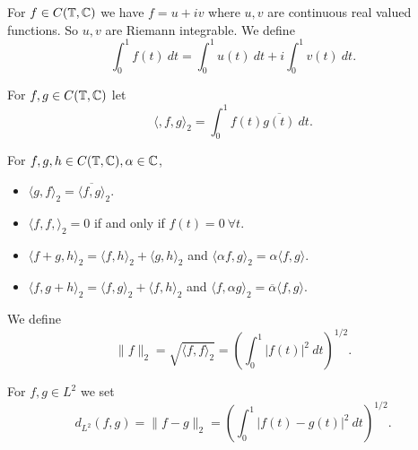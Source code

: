 \documentclass[twoside]{article}
\begin{document}
\begin{definition}
    For $f \in C(\mathbb{T}, \mathbb{C})$ we have $f = u + iv$ where $u, v$ are continuous 
    real valued functions. So $u, v$ are Riemann integrable. We define 
    \begin{equation*}
        \int_{0}^{1} f(t) \ dt = \int_{0}^{1} u(t) \ dt + i \int_{0}^{1}v(t) \ dt.
    \end{equation*}
\end{definition}

\begin{definition}
    For $f, g \in C(\mathbb{T}, \mathbb{C})$ let 
    \begin{equation*}
        \langle, f, g \rangle_{2} = \int_{0}^{1} f(t) \overline{g(t)} \ dt.
    \end{equation*}
\end{definition}

\begin{theorem}
    For $f, g, h \in C(\mathbb{T}, \mathbb{C}), \alpha \in \mathbb{C}$,
    \begin{itemize}
        \item $\langle g, f \rangle_{2} = \overline{\langle f, g \rangle}_{2}$.
        \item $\langle f, f, \rangle_{2} = 0$ if and only if $f(t) = 0 \ \forall t$.
        \item $\langle f + g, h \rangle_{2} = \langle f, h \rangle_{2} + \langle g, h \rangle_{2}$
            and $\langle \alpha f, g \rangle_{2} = \alpha \langle f, g \rangle$.
        \item $\langle f, g + h \rangle_{2} = \langle f, g \rangle_{2} + \langle f, h \rangle_{2}$
            and $\langle f, \alpha g \rangle_{2} = \overline{\alpha} \langle f, g \rangle$.
    \end{itemize}
\end{theorem}

\begin{definition}
    We define 
    \begin{equation*}
        \lVert f \rVert_{2} = \sqrt{\langle f, f \rangle_{2}} = \left(\int_{0}^{1} |f(t)|^2 \ dt\right)^{1/2}.
    \end{equation*}

    For $f, g \in L^{2}$ we set 
    \begin{equation*}
        d_{L^{2}}(f,g) = \lVert f - g \rVert_{2} = \left(\int_{0}^{1} |f(t) - g(t)|^2 \ dt\right)^{1/2}.
    \end{equation*}
\end{definition}
\end{document}
